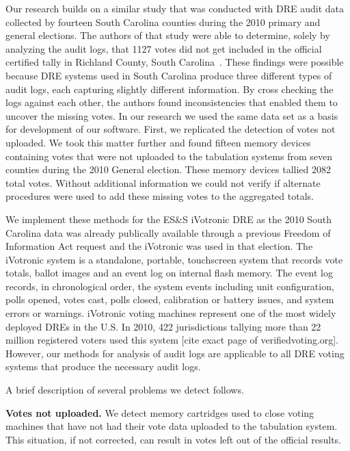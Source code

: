 Our research builds on a similar study that was conducted with DRE audit data collected by fourteen South Carolina counties during the 2010 primary and general elections.  The authors of that study were able to determine, solely by analyzing the audit logs, that 1127 votes did not get included in the official certified tally in Richland County, South Carolina~\cite{Buell2011}. These findings were possible because DRE systems used in South Carolina produce three different types of audit logs, each capturing slightly different information. By cross checking the logs against each other, the authors found inconsistencies that enabled them to uncover the missing votes. In our research we used the same data set as a basis for development of our software. First, we replicated the detection of votes not uploaded. We took this matter further and found fifteen memory devices containing votes that were not uploaded to the tabulation systems from seven counties during the 2010 General election. These memory devices tallied 2082 total votes. Without additional information we could not verify if alternate procedures were used to add these missing votes to the aggregated totals. 

We implement these methods for the ES\&S iVotronic DRE as the 2010 South
Carolina data was already publically available through a previous
Freedom of Information Act request and the iVotronic was used in that election.  The iVotronic system is a
standalone, portable, touchscreen system that records vote totals,
ballot images and an event log on internal flash 
memory. The event log records, in chronological order, the system
events including unit configuration, polls opened, votes cast, polls
closed, calibration or battery issues, and system errors or warnings. 
iVotronic voting machines represent one of the most widely deployed
DREs in the U.S. In 2010, 422 jurisdictions tallying more than 22
million registered voters used this system [cite exact page of
  verifiedvoting.org]. However, our methods for analysis of audit logs
are applicable to all DRE voting systems  that produce the necessary
audit logs.  

A brief description of several problems we detect follows.

\textbf{Votes not uploaded.} We detect  memory cartridges used to close voting machines that have not had their vote data uploaded to the tabulation system. This situation, if not corrected, can result in votes left out of the official results.


